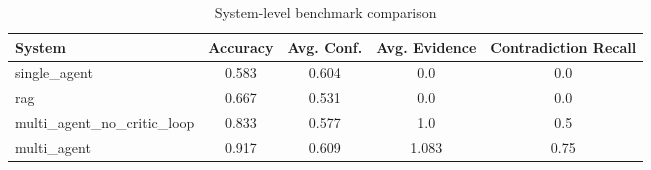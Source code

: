 \begin{table}[ht]
\centering
\begin{tabular}{lcccc}
\hline
System & Accuracy & Avg. Conf. & Avg. Evidence & Contradiction Recall \\
\hline
single_agent & 0.583 & 0.604 & 0.0 & 0.0 \\
rag & 0.667 & 0.531 & 0.0 & 0.0 \\
multi_agent_no_critic_loop & 0.833 & 0.577 & 1.0 & 0.5 \\
multi_agent & 0.917 & 0.609 & 1.083 & 0.75 \\
\hline
\end{tabular}
\caption{System-level benchmark comparison}
\end{table}
